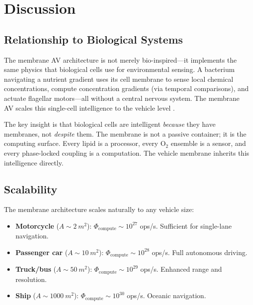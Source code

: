 \documentclass[twocolumn,10pt]{article}
\theoremstyle{definition}
\theoremstyle{remark}
\begin{document}
\section{Discussion}
\label{sec:discussion}

\subsection{Relationship to Biological Systems}

The membrane AV architecture is not merely bio-inspired---it implements the same physics that biological cells use for environmental sensing. A bacterium navigating a nutrient gradient uses its cell membrane to sense local chemical concentrations, compute concentration gradients (via temporal comparisons), and actuate flagellar motors---all without a central nervous system. The membrane AV scales this single-cell intelligence to the vehicle level \cite{sachikonye2025membrane}.

The key insight is that biological cells are intelligent \emph{because} they have membranes, not \emph{despite} them. The membrane is not a passive container; it is the computing surface. Every lipid is a processor, every $\mathrm{O}_2$ ensemble is a sensor, and every phase-locked coupling is a computation. The vehicle membrane inherits this intelligence directly.

\subsection{Scalability}

The membrane architecture scales naturally to any vehicle size:

\begin{itemize}
  \item \textbf{Motorcycle} ($A \sim \SI{2}{m^2}$): $\Phi_{\mathrm{compute}} \sim 10^{27}$ ops/s. Sufficient for single-lane navigation.
  \item \textbf{Passenger car} ($A \sim \SI{10}{m^2}$): $\Phi_{\mathrm{compute}} \sim 10^{28}$ ops/s. Full autonomous driving.
  \item \textbf{Truck/bus} ($A \sim \SI{50}{m^2}$): $\Phi_{\mathrm{compute}} \sim 10^{29}$ ops/s. Enhanced range and resolution.
  \item \textbf{Ship} ($A \sim \SI{1000}{m^2}$): $\Phi_{\mathrm{compute}} \sim 10^{30}$ ops/s. Oceanic navigation.
\end{itemize}
\end{document}
